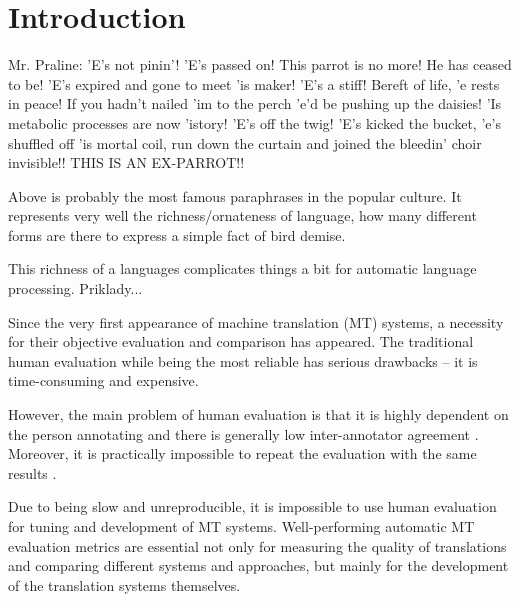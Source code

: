 \chapter*{Introduction}


Mr. Praline: 'E's not pinin'! 'E's passed on! This parrot is no more! He has ceased to be! 'E's expired and gone to meet 'is maker! 'E's a stiff! Bereft of life, 'e rests in peace! If you hadn't nailed 'im to the perch 'e'd be pushing up the daisies! 'Is metabolic processes are now 'istory! 'E's off the twig! 'E's kicked the bucket, 'e's shuffled off 'is mortal coil, run down the curtain and joined the bleedin' choir invisible!! THIS IS AN EX-PARROT!! 

Above is probably the most famous paraphrases in the popular culture. It represents very well the richness/ornateness of language, how many different forms are there to express a simple fact of bird demise. 


This richness of a languages complicates things a bit for automatic language processing. Priklady...


Since the very first appearance of machine translation (MT) systems, a 
necessity for their objective evaluation and comparison has appeared. The 
traditional human evaluation while being the most reliable has serious 
drawbacks -- it is time-consuming and expensive.

However, the main problem of human evaluation is that it is highly dependent on 
the person annotating and there is generally low inter-annotator agreement 
\cite{wmt13}. Moreover, it is practically impossible to repeat the evaluation 
with the same results \cite{bojar-kniha}. 

Due to being slow and unreproducible, it is impossible to use human evaluation
for tuning and development of MT systems. Well-performing automatic MT 
evaluation metrics are essential not only for measuring the quality of translations 
and comparing different systems and approaches, but mainly for the development 
of the translation systems themselves. 



